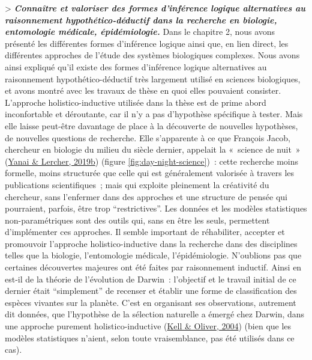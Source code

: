\documentclass[12pt,twoside]{reedthesis}
\begin{document}
\textgreater{} \textbf{\emph{Connaître et valoriser des formes d'inférence logique alternatives au raisonnement hypothético-déductif dans la recherche en biologie, entomologie médicale, épidémiologie.}} Dans le chapitre 2, nous avons présenté les différentes formes d'inférence logique ainsi que, en lien direct, les différentes approches de l'étude des systèmes biologiques complexes. Nous avons ainsi expliqué qu'il existe des formes d'inférence logique alternatives au raisonnement hypothético-déductif très largement utilisé en sciences biologiques, et avons montré avec les travaux de thèse en quoi elles pouvaient consister. L'approche holistico-inductive utilisée dans la thèse est de prime abord inconfortable et déroutante, car il n'y a pas d'hypothèse spécifique à tester. Mais elle laisse peut-être davantage de place à la découverte de nouvelles hypothèses, de nouvelles questions de recherche. Elle s'apparente à ce que François Jacob, chercheur en biologie du milieu du siècle dernier, appelait la «~science de nuit~» (\protect\hyperlink{ref-yanai_what_2019}{Yanai \& Lercher, 2019b}) (figure \ref{fig:day-night-science})~: cette recherche moins formelle, moins structurée que celle qui est généralement valorisée à travers les publications scientifiques~; mais qui exploite pleinement la créativité du chercheur, sans l'enfermer dans des approches et une structure de pensée qui pourraient, parfois, être trop ``restrictives''. Les données et les modèles statistiques non-paramétriques sont des outils qui, sans en être les seuls, permettent d'implémenter ces approches. Il semble important de réhabiliter, accepter et promouvoir l'approche holistico-inductive dans la recherche dans des disciplines telles que la biologie, l'entomologie médicale, l'épidémiologie. N'oublions pas que certaines découvertes majeures ont été faites par raisonnement inductif. Ainsi en est-il de la théorie de l'évolution de Darwin~: l'objectif et le travail initial de ce dernier était ``simplement'' de recenser et établir une forme de classification des espèces vivantes sur la planète. C'est en organisant ses observations, autrement dit données, que l'hypothèse de la sélection naturelle a émergé chez Darwin, dans une approche purement holistico-inductive (\protect\hyperlink{ref-kell_here_2004}{Kell \& Oliver, 2004}) (bien que les modèles statistiques n'aient, selon toute vraisemblance, pas été utilisés dans ce cas).\\
\end{document}
